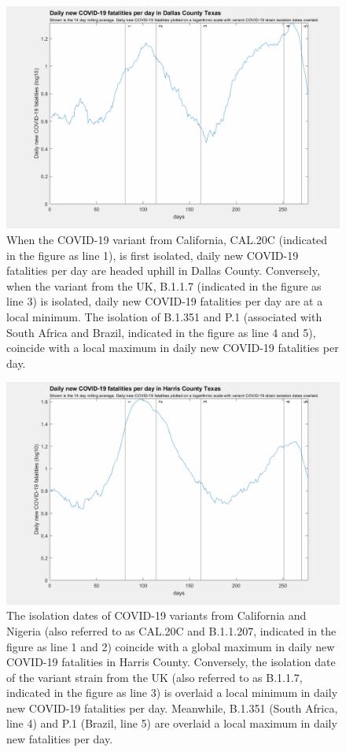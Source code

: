 \documentclass[]{article}
\begin{document}
\begin{figure}[!h]
	\includegraphics[width=\linewidth]{images/dallas_fatalities_strains_log.png}
	\caption{When the COVID-19 variant from California, CAL.20C (indicated in the figure as line 1), is first isolated, daily new COVID-19 fatalities per day are headed uphill in Dallas County. Conversely, when the variant from the UK, B.1.1.7 (indicated in the figure as line 3) is isolated, daily new COVID-19 fatalities per day are at a local minimum. The isolation of B.1.351 and P.1 (associated with South Africa and Brazil, indicated in the figure as line 4 and 5), coincide with a local maximum in daily new COVID-19 fatalities per day.}
	\label{fig:images/dallas_fatalities_strains_logLabel}
\end{figure}

\begin{figure}[!h]
	\includegraphics[width=\linewidth]{images/harris_fatalities_strains_log.png}
	\caption{The isolation dates of COVID-19 variants from California and Nigeria (also referred to as CAL.20C and B.1.1.207, indicated in the figure as line 1 and 2) coincide with a global maximum in daily new COVID-19 fatalities in Harris County. Conversely, the isolation date of the variant strain from the UK (also referred to as B.1.1.7, indicated in the figure as line 3) is overlaid a local minimum in daily new COVID-19 fatalities per day. Meanwhile, B.1.351 (South Africa, line 4) and P.1 (Brazil, line 5) are overlaid a local maximum in daily new fatalities per day. }
	\label{fig:images/harris_fatalities_strains_logLabel}
\end{figure}
\end{document}
